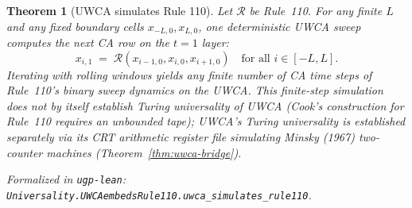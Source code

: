 \documentclass[12pt]{article}
\newtheorem{theorem}{Theorem}[section]
\numberwithin{equation}{section}
\begin{document}
\begin{theorem}[UWCA simulates Rule 110]\label{thm:uwca-universal}
Let $\mathcal{R}$ be Rule~110. For any finite $L$ and any fixed boundary cells $x_{-L,0},x_{L,0}$, one deterministic UWCA sweep computes the next CA row on the $t{=}1$ layer:
\[
x_{i,1} \;=\; \mathbf{\mathcal{R}}(x_{i-1,0},x_{i,0},x_{i+1,0}) \quad\text{for all } i\in[-L,L].
\]
Iterating with rolling windows yields any finite number of CA time steps of Rule~110's binary sweep dynamics on the UWCA. This finite-step simulation does not by itself establish Turing universality of UWCA (Cook's construction for Rule~110 requires an unbounded tape); UWCA's Turing universality is established separately via its CRT arithmetic register file simulating Minsky (1967) two-counter machines (Theorem~\ref{thm:uwca-bridge}).

\noindent\emph{Formalized in} \texttt{ugp-lean}: \texttt{Universality.UWCAembedsRule110.uwca\_simulates\_rule110}.
\end{theorem}
\end{document}
